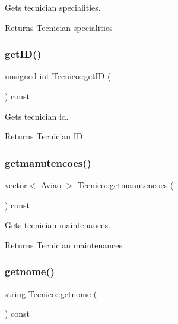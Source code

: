 Gets tecnician specialities. 

\begin{DoxyReturn}{Returns}
Tecnician specialities 
\end{DoxyReturn}
\mbox{\label{class_tecnico_ac83d463f1f27671e9dc64045eb841644}} 
\subsubsection{\texorpdfstring{get\+I\+D()}{getID()}}
{\footnotesize\ttfamily unsigned int Tecnico\+::get\+ID (\begin{DoxyParamCaption}{ }\end{DoxyParamCaption}) const}



Gets tecnician id. 

\begin{DoxyReturn}{Returns}
Tecnician ID 
\end{DoxyReturn}
\mbox{\label{class_tecnico_abbc1049bcfe9772a1155730950b5736f}} 
\subsubsection{\texorpdfstring{getmanutencoes()}{getmanutencoes()}}
{\footnotesize\ttfamily vector$<$ \hyperlink{class_aviao}{Aviao} $>$ Tecnico\+::getmanutencoes (\begin{DoxyParamCaption}{ }\end{DoxyParamCaption}) const}



Gets tecnician maintenances. 

\begin{DoxyReturn}{Returns}
Tecnician maintenances 
\end{DoxyReturn}
\mbox{\label{class_tecnico_ac26bc8c39d4b0a174d3e7cacd53414aa}} 
\subsubsection{\texorpdfstring{getnome()}{getnome()}}
{\footnotesize\ttfamily string Tecnico\+::getnome (\begin{DoxyParamCaption}{ }\end{DoxyParamCaption}) const}



